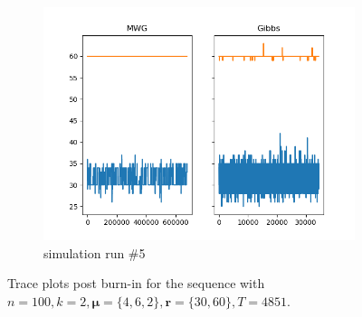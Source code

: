 \begin{figure}[H]
\begin{subfigure}{.3\textwidth}
    	\includegraphics[width=\linewidth]{../../plots/Trace_post_burnin_M3_N100_NMCMC3_seed4_diffind2.png}
    	\caption{simulation run \#5}
	\end{subfigure}
	\caption{Trace plots post burn-in for the sequence with $n=100, k=2, \bm{\mu} = \{4,6,2\}, \bm{r} = \{30,60\}, T=4851$.}
\end{figure}

